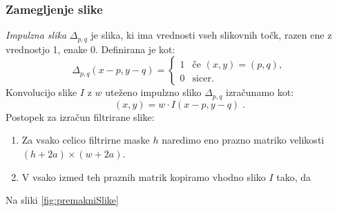 \subsubsection{Zamegljenje slike}\label{sec:ZamegljenjeSlike}
%
\emph{Impulzna slika} $\Delta_{p,q}$ je slika, ki ima vrednosti vseh slikovnih točk, razen ene z vrednostjo 1, enake 0. Definirana je kot:
$$
\Delta_{p,q}(x - p, y - q)=
\begin{cases}
  1 & \mbox{če } (x, y) = (p,q), \\ 
  0 & \mbox{sicer}.
\end{cases}
$$
%
Konvolucijo slike $I$ z $w$ uteženo impulzno sliko $\Delta_{p,q}$ izračunamo kot:
\begin{equation*}
[I \ast w\Delta_{p,q}](x,y) = w \cdot I(x - p, y - q) \;.
\end{equation*}
%
Postopek za izračun filtrirane slike:
%
\begin{enumerate}
  \item Za vsako celico filtrirne maske $h$ naredimo eno prazno matriko velikosti $(h+2a)\times(w+2a)$.
  \item V vsako izmed teh praznih matrik kopiramo vhodno sliko $I$ tako, da
\end{enumerate}
%
Na sliki \ref{fig:premakniSlike}
%
